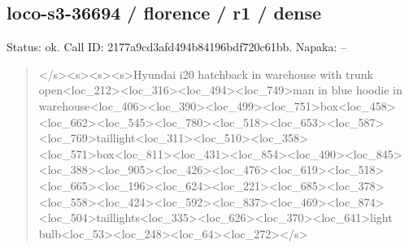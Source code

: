 \documentclass[10pt,a4paper]{article}
\begin{document}
\subsection*{loco-s3-36694 / florence / r1 / dense}
Status: ok. Call ID: 2177a9cd3afd494b84196bdf720c61bb. Napaka: --
\begin{quote}\footnotesize
</s>\allowbreak{}<s>\allowbreak{}<s>\allowbreak{}<s>\allowbreak{}Hyundai i20 hatchback in warehouse with trunk open<loc\_212>\allowbreak{}<loc\_316>\allowbreak{}<loc\_494>\allowbreak{}<\allowbreak{}loc\_749>\allowbreak{}man in blue hoodie in warehouse<loc\_406>\allowbreak{}<loc\_390>\allowbreak{}<loc\_\allowbreak{}499>\allowbreak{}<loc\_751>\allowbreak{}box<loc\_458>\allowbreak{}<loc\_66\allowbreak{}2>\allowbreak{}<loc\_545>\allowbreak{}<loc\_780>\allowbreak{}<loc\_518>\allowbreak{}<lo\allowbreak{}c\_653>\allowbreak{}<loc\_587>\allowbreak{}<loc\_769>\allowbreak{}tailligh\allowbreak{}t<loc\_311>\allowbreak{}<loc\_510>\allowbreak{}<loc\_358>\allowbreak{}<loc\allowbreak{}\_571>\allowbreak{}box<loc\_811>\allowbreak{}<loc\_431>\allowbreak{}<loc\_8\allowbreak{}54>\allowbreak{}<loc\_490>\allowbreak{}<loc\_845>\allowbreak{}<loc\_388>\allowbreak{}<l\allowbreak{}oc\_905>\allowbreak{}<loc\_426>\allowbreak{}<loc\_476>\allowbreak{}<loc\_61\allowbreak{}9>\allowbreak{}<loc\_518>\allowbreak{}<loc\_665>\allowbreak{}<loc\_196>\allowbreak{}<lo\allowbreak{}c\_624>\allowbreak{}<loc\_221>\allowbreak{}<loc\_685>\allowbreak{}<loc\_378\allowbreak{}>\allowbreak{}<loc\_558>\allowbreak{}<loc\_424>\allowbreak{}<loc\_592>\allowbreak{}<loc\allowbreak{}\_837>\allowbreak{}<loc\_469>\allowbreak{}<loc\_874>\allowbreak{}<loc\_504>\allowbreak{}\allowbreak{}taillights<loc\_335>\allowbreak{}<loc\_626>\allowbreak{}<loc\allowbreak{}\_370>\allowbreak{}<loc\_641>\allowbreak{}light bulb<loc\_53>\allowbreak{}<loc\_248>\allowbreak{}<loc\_64>\allowbreak{}<lo\allowbreak{}c\_272>\allowbreak{}</s>\allowbreak{}
\end{quote}
\end{document}
